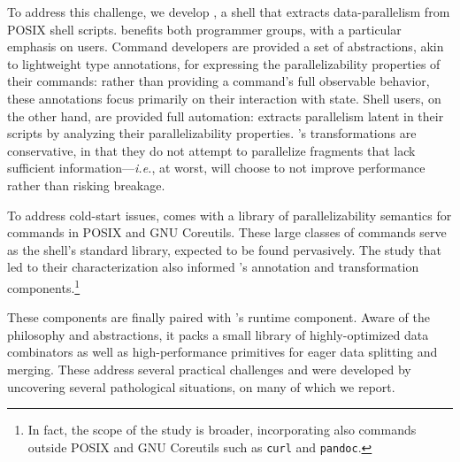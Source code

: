 \documentclass[letterpaper,twocolumn,10pt]{article}
\newcommand{\ie}{{\em i.e.}, }
\newcommand{\ttt}[1]{\texttt{#1}}
\newcommand{\nv}[1]{[{\color{cyan}nv: #1}]}
\newcommand{\kk}[1]{[{\color{magenta}kk: #1}]}
\begin{document}
To address this challenge, we develop \sys, a shell that extracts data-parallelism from POSIX shell scripts.
\sys benefits both programmer groups, %
  with a particular emphasis on users.
Command developers are provided a set of abstractions, akin to lightweight type annotations, for expressing the parallelizability properties of their commands:
  rather than providing a command's full observable behavior, these annotations focus primarily on their interaction with state.
Shell users, on the other hand, are provided full automation:
  \sys extracts parallelism latent in their scripts by analyzing their parallelizability properties. %
\sys's transformations are conservative, in that they do not attempt to parallelize fragments that lack sufficient information---\ie at worst, \sys will choose to not improve performance rather than risking breakage.

To address cold-start issues, \sys comes with a library of parallelizability semantics for commands in POSIX and GNU Coreutils.
These large classes of commands serve as the shell's standard library, expected to be found pervasively. %
The study that led to their characterization also informed \sys's annotation and transformation components.\footnote{
  In fact, the scope of the study is broader, incorporating also commands outside POSIX and GNU Coreutils such as \ttt{curl} and \ttt{pandoc}.
}

These components are finally paired with \sys's runtime component.
Aware of the \unix philosophy and abstractions, it packs a small library of highly-optimized data combinators as well as high-performance primitives for eager data splitting and merging.
These address several practical challenges %
  and were developed by uncovering several pathological situations, on many of which we report.
\end{document}

